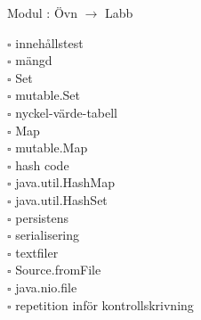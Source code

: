
    Modul : Övn  $\rightarrow$ Labb 
    \begin{multicols}{3}\SlideFontTiny
    $\square$ innehållstest \\
$\square$ mängd \\
$\square$ Set \\
$\square$ mutable.Set \\
$\square$ nyckel-värde-tabell \\
$\square$ Map \\
$\square$ mutable.Map \\
$\square$ hash code \\
$\square$ java.util.HashMap \\
$\square$ java.util.HashSet \\
$\square$ persistens \\
$\square$ serialisering \\
$\square$ textfiler \\
$\square$ Source.fromFile \\
$\square$ java.nio.file \\
$\square$ repetition inför kontrollskrivning \\
    \end{multicols}
    